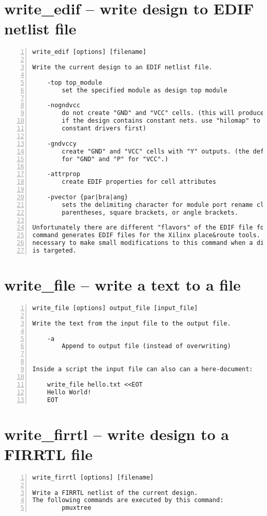 \section{write\_edif -- write design to EDIF netlist file}
\label{cmd:write_edif}
\begin{lstlisting}[numbers=left,frame=single]
    write_edif [options] [filename]

Write the current design to an EDIF netlist file.

    -top top_module
        set the specified module as design top module

    -nogndvcc
        do not create "GND" and "VCC" cells. (this will produce an error
        if the design contains constant nets. use "hilomap" to map to custom
        constant drivers first)

    -gndvccy
        create "GND" and "VCC" cells with "Y" outputs. (the default is "G"
        for "GND" and "P" for "VCC".)

    -attrprop
        create EDIF properties for cell attributes

    -pvector {par|bra|ang}
        sets the delimiting character for module port rename clauses to
        parentheses, square brackets, or angle brackets.

Unfortunately there are different "flavors" of the EDIF file format. This
command generates EDIF files for the Xilinx place&route tools. It might be
necessary to make small modifications to this command when a different tool
is targeted.
\end{lstlisting}

\section{write\_file -- write a text to a file}
\label{cmd:write_file}
\begin{lstlisting}[numbers=left,frame=single]
    write_file [options] output_file [input_file]

Write the text from the input file to the output file.

    -a
        Append to output file (instead of overwriting)


Inside a script the input file can also can a here-document:

    write_file hello.txt <<EOT
    Hello World!
    EOT
\end{lstlisting}

\section{write\_firrtl -- write design to a FIRRTL file}
\label{cmd:write_firrtl}
\begin{lstlisting}[numbers=left,frame=single]
    write_firrtl [options] [filename]

Write a FIRRTL netlist of the current design.
The following commands are executed by this command:
        pmuxtree
\end{lstlisting}

